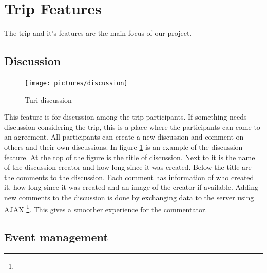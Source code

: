 \documentclass[a4paper]{article}
\begin{document}
\section{Trip Features}
The trip and it's features are the main focus of our project. 
\subsection{Discussion}

\begin{figure}%
  \begin{center}
    \vspace{-0pt}
    \texttt{[image: pictures/discussion]}
  
  \end{center}
\caption{Turi discussion}
\label{fig:discussion}
\end{figure}

This feature is for discussion among the trip participants. If something needs discussion considering the trip, this is a place where the participants can come to an agreement. All participants can create a new discussion and comment on others and their own discussions. In figure \ref{fig:discussion} is an example of the discussion feature. At the top of the figure is the title of discussion. Next to it is the name of the discussion creator and how long since it was created. Below the title are the comments to the discussion. Each comment has information of who created it, how long since it was created and an image of the creator if available. Adding new comments to the discussion is done by exchanging data to the server using AJAX \footnote{\AJAX}. This gives a smoother experience for the commentator. 

\subsection{Event management}
\end{document}

